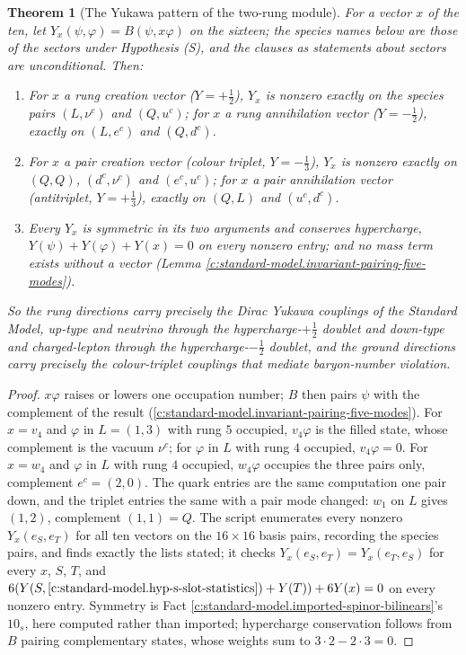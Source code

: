 \documentclass[11pt]{article}
\newtheorem{theorem}{Theorem}[section]
\theoremstyle{definition}
\theoremstyle{plain}
\newcommand{\changedmark}[2]{\marginpar{\raggedright\scriptsize\color{#1}#2}}
\begin{document}
\begin{theorem}[The Yukawa pattern of the two-rung module]\label{c:standard-model.yukawa-pattern-two-rung-module}
\changedmark{gray}{reworded}
For a vector $x$ of the ten, let $Y_{x}(\psi, \varphi) = B(\psi, x\varphi)$ on the sixteen; the species names below are those of the sectors under Hypothesis (S), and the clauses as statements about sectors are unconditional. Then:
\begin{enumerate}
\item[(i)] For $x$ a rung creation vector ($Y = +\tfrac12$), $Y_{x}$ is nonzero exactly on the species pairs $(L, \nu^{c})$ and $(Q, u^{c})$; for $x$ a rung annihilation vector ($Y = -\tfrac12$), exactly on $(L, e^{c})$ and $(Q, d^{c})$.
\item[(ii)] For $x$ a pair creation vector (colour triplet, $Y = -\tfrac13$), $Y_{x}$ is nonzero exactly on $(Q, Q)$, $(d^{c}, \nu^{c})$ and $(e^{c}, u^{c})$; for $x$ a pair annihilation vector (antitriplet, $Y = +\tfrac13$), exactly on $(Q, L)$ and $(u^{c}, d^{c})$.
\item[(iii)] Every $Y_{x}$ is symmetric in its two arguments and conserves hypercharge, $Y(\psi) + Y(\varphi) + Y(x) = 0$ on every nonzero entry; and no mass term exists without a vector (Lemma \ref{c:standard-model.invariant-pairing-five-modes}).
\end{enumerate}
So the rung directions carry precisely the Dirac Yukawa couplings of the Standard Model, up-type and neutrino through the hypercharge-$+\tfrac12$ doublet and down-type and charged-lepton through the hypercharge-$-\tfrac12$ doublet, and the ground directions carry precisely the colour-triplet couplings that mediate baryon-number violation.
\end{theorem}
\begin{proof}
$x\varphi$ raises or lowers one occupation number; $B$ then pairs $\psi$ with the complement of the result (\ref{c:standard-model.invariant-pairing-five-modes}). For $x = v_{4}$ and $\varphi$ in $L = (1,3)$ with rung $5$ occupied, $v_{4}\varphi$ is the filled state, whose complement is the vacuum $\nu^{c}$; for $\varphi$ in $L$ with rung $4$ occupied, $v_{4}\varphi = 0$. For $x = w_{4}$ and $\varphi$ in $L$ with rung $4$ occupied, $w_{4}\varphi$ occupies the three pairs only, complement $e^{c} = (2,0)$. The quark entries are the same computation one pair down, and the triplet entries the same with a pair mode changed: $w_{1}$ on $L$ gives $(1,2)$, complement $(1,1) = Q$. The script enumerates every nonzero $Y_{x}(e_{S}, e_{T})$ for all ten vectors on the $16 \times 16$ basis pairs, recording the species pairs, and finds exactly the lists stated; it checks $Y_{x}(e_{S}, e_{T}) = Y_{x}(e_{T}, e_{S})$ for every $x$, $S$, $T$, and $6(Y(S, \ref{c:standard-model.hyp-s-slot-statistics}) + Y(T)) + 6Y(x) = 0$ on every nonzero entry. Symmetry is Fact \ref{c:standard-model.imported-spinor-bilinears}'s $10_{s}$, here computed rather than imported; hypercharge conservation follows from $B$ pairing complementary states, whose weights sum to $3 \cdot 2 - 2 \cdot 3 = 0$.

\end{proof}
\end{document}
